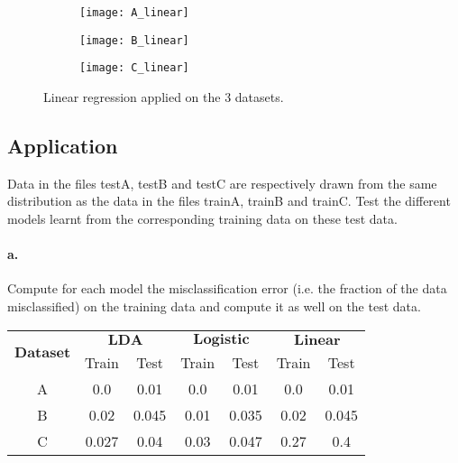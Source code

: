 \documentclass{article}
\begin{document}
\begin{figure}[h!]
    \centering
    \begin{subfigure}[b]{0.3\linewidth}
        \texttt{[image: A\_linear]}
    \end{subfigure}
    \begin{subfigure}[b]{0.3\linewidth}
        \texttt{[image: B\_linear]}
    \end{subfigure}
    \begin{subfigure}[b]{0.3\linewidth}
        \texttt{[image: C\_linear]}
    \end{subfigure}
    \caption{Linear regression applied on the 3 datasets.}
    \label{fig:linear}
\end{figure}


\subsection{Application}
Data in the files testA, testB and testC are respectively drawn from the same distribution
as the data in the files trainA, trainB and trainC. Test the different models learnt from the corresponding training data on these test data.

\paragraph{a.} Compute for each model the misclassification error (i.e. the fraction of the data misclassified)
on the training data and compute it as well on the test data.\vspace{10px}

\begin{center}
    \begin{tabular}{| c || c | c || c | c || c | c |}
        \hline
        \multirow{2}{*}{$\mathbf{Dataset}$} & \multicolumn{2}{|c||}{$\mathbf{LDA}$} & \multicolumn{2}{|c|}{$\mathbf{Logistic}$} & \multicolumn{2}{|c|}{$\mathbf{Linear}$}                         \\
                                            & Train                                 & Test                                      & Train                                   & Test  & Train & Test  \\
        \hline
        A                                   & 0.0                                   & 0.01                                      & 0.0                                     & 0.01  & 0.0   & 0.01  \\
        \hline
        B                                   & 0.02                                  & 0.045                                     & 0.01                                    & 0.035 & 0.02  & 0.045 \\
        \hline
        C                                   & 0.027                                 & 0.04                                      & 0.03                                    & 0.047 & 0.27  & 0.4   \\
        \hline
    \end{tabular}
\end{center}
\end{document}
